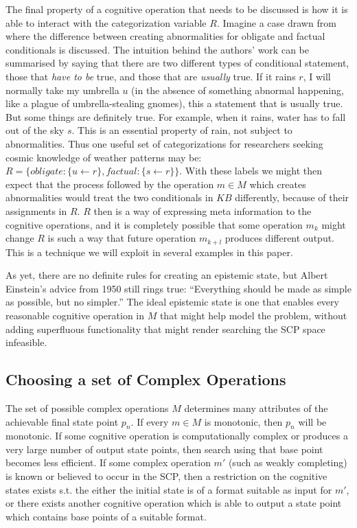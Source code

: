 \documentclass{article}
\begin{document}
The final property of a cognitive operation that needs to be discussed is how it is able to interact with the categorization variable $R$. Imagine a case drawn from \citep{saldanha2017weak} where the difference between creating abnormalities for obligate and factual conditionals is discussed. The intuition behind the authors' work can be summarised by saying that there are two different types of conditional statement, those that \textit{have to be} true, and those that are \textit{usually} true. If it rains $r$, I will normally take my umbrella $u$ (in the absence of something abnormal happening, like a plague of umbrella-stealing gnomes), this a statement that is usually true. But some things are definitely true. For example, when it rains, water has to fall out of the sky $s$. This is an essential property of rain, not subject to abnormalities. Thus one useful set of categorizations for researchers seeking cosmic knowledge of weather patterns may be: $R=\{obligate: \{u \leftarrow r\}, factual: \{s \leftarrow r\} \}$. With these labels we might then expect that the process followed by the operation $m \in M$ which creates abnormalities would treat the two conditionals in $KB$ differently, because of their assignments in $R$. $R$ then is a way of expressing meta information to the cognitive operations, and it is completely possible that some operation $m_k$ might change $R$ is such a way that future operation $m_{k+l}$ produces different output. This is a technique we will exploit in several examples in this paper.

As yet, there are no definite rules for creating an epistemic state, but Albert Einstein's advice from 1950 still rings true: ``Everything should be made as simple as possible, but no simpler.'' The ideal epistemic state is one that enables every reasonable cognitive operation in $M$ that might help model the problem, without adding superfluous functionality that might render searching the SCP space infeasible.
\subsection{Choosing a set of Complex Operations}
The set of possible complex operations $M$ determines many attributes of the achievable final state point $p_n$. If every $m \in M$ is monotonic, then $p_n$ will be monotonic. If some cognitive operation is computationally complex or produces a very large number of output state points, then search using that base point becomes less efficient. If some complex operation $m'$ (such as weakly completing) is known or believed to occur in the SCP, then a restriction on the cognitive states exists s.t. the either the initial state is of a format suitable as input for $m'$, or there exists another cognitive operation which is able to output a state point which contains base points of a suitable format.
\end{document}

